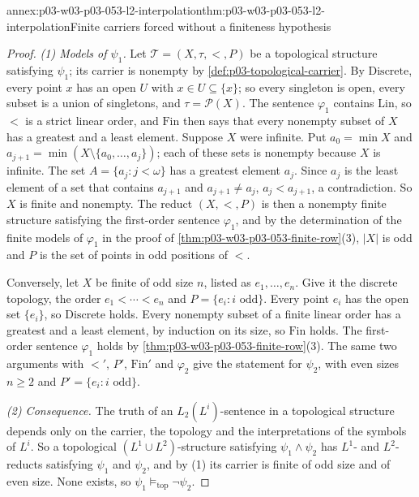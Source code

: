 \begin{annexitem}{annex:p03-w03-p03-053-l2-interpolation}{thm:p03-w03-p03-053-l2-interpolation}{Finite carriers forced without a finiteness hypothesis}
\begin{proof}
\emph{(1) Models of \(\psi_1\).} Let \(\mathcal T=(X,\tau,<,P)\) be a
topological structure satisfying \(\psi_1\); its carrier is nonempty by
\cref{def:p03-topological-carrier}. By \(\mathrm{Discrete}\), every point
\(x\) has an open \(U\) with \(x\in U\subseteq\{x\}\); so every singleton
is open, every subset is a union of singletons, and \(\tau=\mathcal P(X)\).
The sentence \(\varphi_1\) contains \(\mathrm{Lin}\), so \(<\) is a strict
linear order, and \(\mathrm{Fin}\) then says that every nonempty subset of
\(X\) has a greatest and a least element. Suppose \(X\) were infinite. Put
\(a_0=\min X\) and \(a_{j+1}=\min(X\setminus\{a_0,\ldots,a_j\})\); each of
these sets is nonempty because \(X\) is infinite. The set
\(A=\{a_j:j<\omega\}\) has a greatest element \(a_j\). Since \(a_j\) is the
least element of a set that contains \(a_{j+1}\) and \(a_{j+1}\ne a_j\),
\(a_j<a_{j+1}\), a contradiction. So \(X\) is finite and nonempty. The
reduct \((X,<,P)\) is then a nonempty finite structure satisfying the
first-order sentence \(\varphi_1\), and by the determination of the finite
models of \(\varphi_1\) in the proof of
\cref{thm:p03-w03-p03-053-finite-row}(3), \(|X|\) is odd and \(P\) is the
set of points in odd positions of \(<\).

Conversely, let \(X\) be finite of odd size \(n\), listed as
\(e_1,\ldots,e_n\). Give it the discrete topology, the order
\(e_1<\cdots<e_n\) and \(P=\{e_i:i\text{ odd}\}\). Every point \(e_i\) has
the open set \(\{e_i\}\), so \(\mathrm{Discrete}\) holds. Every nonempty
subset of a finite linear order has a greatest and a least element, by
induction on its size, so \(\mathrm{Fin}\) holds. The first-order sentence
\(\varphi_1\) holds by \cref{thm:p03-w03-p03-053-finite-row}(3). The same
two arguments with \(<'\), \(P'\), \(\mathrm{Fin}'\) and \(\varphi_2\) give
the statement for \(\psi_2\), with even sizes \(n\ge2\) and
\(P'=\{e_i:i\text{ odd}\}\).

\emph{(2) Consequence.} The truth of an \(L_2(L^i)\)-sentence in a
topological structure depends only on the carrier, the topology and the
interpretations of the symbols of \(L^i\). So a topological
\((L^1\cup L^2)\)-structure satisfying \(\psi_1\land\psi_2\) has
\(L^1\)- and \(L^2\)-reducts satisfying \(\psi_1\) and \(\psi_2\), and by
(1) its carrier is finite of odd size and of even size. None exists, so
\(\psi_1\models_{\mathrm{top}}\neg\psi_2\).


\end{proof}
\end{annexitem}
